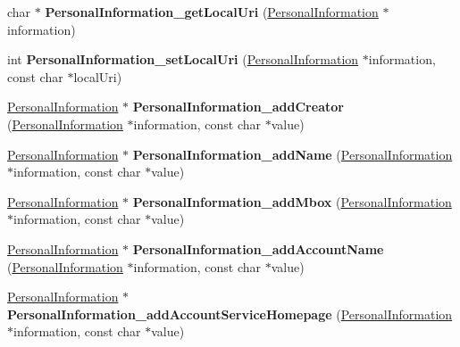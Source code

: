 \begin{DoxyCompactItemize}
char $\ast$ {\bfseries Personal\+Information\+\_\+get\+Local\+Uri} (\hyperlink{classomexmeta_1_1PersonalInformation}{Personal\+Information} $\ast$information)
\item 
\mbox{\label{namespaceomexmeta_af1ed67bfbe5c55b04c5164030f9f5fef}} 
int {\bfseries Personal\+Information\+\_\+set\+Local\+Uri} (\hyperlink{classomexmeta_1_1PersonalInformation}{Personal\+Information} $\ast$information, const char $\ast$local\+Uri)
\item 
\mbox{\label{namespaceomexmeta_a46f59a8d3104d824826d5dd104d55393}} 
\hyperlink{classomexmeta_1_1PersonalInformation}{Personal\+Information} $\ast$ {\bfseries Personal\+Information\+\_\+add\+Creator} (\hyperlink{classomexmeta_1_1PersonalInformation}{Personal\+Information} $\ast$information, const char $\ast$value)
\item 
\mbox{\label{namespaceomexmeta_af1ab848f3e3f81ab4dbc822c84aab92e}} 
\hyperlink{classomexmeta_1_1PersonalInformation}{Personal\+Information} $\ast$ {\bfseries Personal\+Information\+\_\+add\+Name} (\hyperlink{classomexmeta_1_1PersonalInformation}{Personal\+Information} $\ast$information, const char $\ast$value)
\item 
\mbox{\label{namespaceomexmeta_a30bf0fbfd78a23a0e2d87e1cb981cc8a}} 
\hyperlink{classomexmeta_1_1PersonalInformation}{Personal\+Information} $\ast$ {\bfseries Personal\+Information\+\_\+add\+Mbox} (\hyperlink{classomexmeta_1_1PersonalInformation}{Personal\+Information} $\ast$information, const char $\ast$value)
\item 
\mbox{\label{namespaceomexmeta_a75306b1329c755b124ad9b40f147abdc}} 
\hyperlink{classomexmeta_1_1PersonalInformation}{Personal\+Information} $\ast$ {\bfseries Personal\+Information\+\_\+add\+Account\+Name} (\hyperlink{classomexmeta_1_1PersonalInformation}{Personal\+Information} $\ast$information, const char $\ast$value)
\item 
\mbox{\label{namespaceomexmeta_ad597791b54c6f08a3572033aab6487dd}} 
\hyperlink{classomexmeta_1_1PersonalInformation}{Personal\+Information} $\ast$ {\bfseries Personal\+Information\+\_\+add\+Account\+Service\+Homepage} (\hyperlink{classomexmeta_1_1PersonalInformation}{Personal\+Information} $\ast$information, const char $\ast$value)

\end{DoxyCompactItemize}
